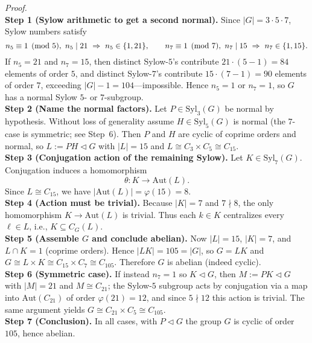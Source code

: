\documentclass[11pt]{article}
\theoremstyle{definition}
\newcommand{\Aut}{\mathrm{Aut}}
\newcommand{\Syl}{\mathrm{Syl}}
\begin{document}
\emph{Proof.}\\
\textbf{Step 1 (Sylow arithmetic to get a second normal).} Since $|G|=3\cdot 5\cdot 7$, Sylow numbers satisfy
\[
n_5\equiv 1\pmod 5,\ n_5\mid 21\ \Rightarrow\ n_5\in\{1,21\},\qquad
n_7\equiv 1\pmod 7,\ n_7\mid 15\ \Rightarrow\ n_7\in\{1,15\}.\\
\]
If $n_5=21$ and $n_7=15$, then distinct Sylow-$5$’s contribute $21\cdot(5-1)=84$ elements of order $5$, and distinct Sylow-$7$’s contribute $15\cdot(7-1)=90$ elements of order $7$, exceeding $|G|-1=104$—impossible. Hence $n_5=1$ or $n_7=1$, so $G$ has a normal Sylow $5$- or $7$-subgroup.\\
\textbf{Step 2 (Name the normal factors).} Let $P\in\Syl_3(G)$ be normal by hypothesis. Without loss of generality assume $H\in\Syl_5(G)$ is normal (the $7$-case is symmetric; see Step~6). Then $P$ and $H$ are cyclic of coprime orders and normal, so $L:=PH\lhd G$ with $|L|=15$ and $L\cong C_3\times C_5\cong C_{15}$.\\
\textbf{Step 3 (Conjugation action of the remaining Sylow).} Let $K\in\Syl_7(G)$. Conjugation induces a homomorphism
\[
\theta:K\longrightarrow \Aut(L).
\]
Since $L\cong C_{15}$, we have $|\Aut(L)|=\varphi(15)=8$.\\
\textbf{Step 4 (Action must be trivial).} Because $|K|=7$ and $7\nmid 8$, the only homomorphism $K\to \Aut(L)$ is trivial. Thus each $k\in K$ centralizes every $\ell\in L$, i.e., $K\subseteq C_G(L)$.\\
\textbf{Step 5 (Assemble $G$ and conclude abelian).} Now $|L|=15$, $|K|=7$, and $L\cap K=1$ (coprime orders). Hence $|LK|=105=|G|$, so $G=LK$ and $G\cong L\times K\cong C_{15}\times C_7\cong C_{105}$. Therefore $G$ is abelian (indeed cyclic).\\
\textbf{Step 6 (Symmetric case).} If instead $n_7=1$ so $K\lhd G$, then $M:=PK\lhd G$ with $|M|=21$ and $M\cong C_{21}$; the Sylow-$5$ subgroup acts by conjugation via a map into $\Aut(C_{21})$ of order $\varphi(21)=12$, and since $5\nmid 12$ this action is trivial. The same argument yields $G\cong C_{21}\times C_5\cong C_{105}$.\\
\textbf{Step 7 (Conclusion).} In all cases, with $P\lhd G$ the group $G$ is cyclic of order $105$, hence abelian.\\

\newpage
\end{document}
